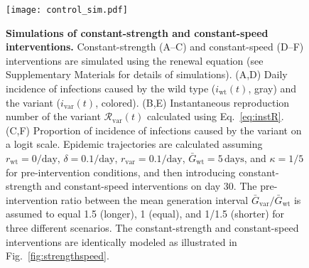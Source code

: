 \documentclass[12pt]{article}
\newcommand{\eref}[1]{Eq.~\ref{eq:#1}}
\newcommand{\fref}[1]{Fig.~\ref{fig:#1}}
\newcommand{\vvvar}{\mathrm{var}}
\newcommand{\wwwt}{\mathrm{wt}}
\newcommand{\rx}[1]{\ensuremath{{r}_{#1}}\xspace}
\newcommand{\rw}{\rx{\wwwt}}
\newcommand{\rv}{\rx{\vvvar}}
\newcommand{\Rx}[1]{\ensuremath{{\mathcal R}_{#1}}\xspace}
\newcommand{\Rv}{\Rx{\vvvar}}
\newcommand{\pday}{\ensuremath{/\textrm{day}}}
\newcommand{\ix}[1]{\ensuremath{{i}_{#1}}\xspace}
\newcommand{\iw}{\ix{\wwwt}}
\newcommand{\iv}{\ix{\vvvar}}
\newcommand{\Gx}[1]{\ensuremath{{\bar G}_{#1}}\xspace}
\newcommand{\Gy}[1]{\Gx{\mathrm{#1}}}
\begin{document}
\begin{figure}[!th]
\begin{center}
\texttt{[image: control\_sim.pdf]}
\caption{
\textbf{Simulations of constant-strength and constant-speed interventions.}
Constant-strength (A--C) and constant-speed (D--F) interventions are simulated using the renewal equation (see Supplementary Materials for details of simulations).
(A,D) Daily incidence of infections caused by the wild type ($\iw(t)$, gray) and the variant ($\iv(t)$, colored).
(B,E) Instantaneous reproduction number of the variant $\Rv(t)$ calculated using \eref{instR}.
(C,F) Proportion of incidence of infections caused by the variant on a logit scale. 
Epidemic trajectories are calculated assuming $\rw=0\pday$, $\delta=0.1\pday$, $\rv=0.1\pday$, $\Gy{wt}=5\,\textrm{days}$, and $\kappa=1/5$ for pre-intervention conditions, and then introducing constant-strength and constant-speed interventions on day 30.
The pre-intervention ratio between the mean generation interval $\Gy{var}/\Gy{wt}$ is assumed to equal 1.5 (longer), 1 (equal), and 1/1.5 (shorter) for three different scenarios.
The constant-strength and constant-speed interventions are identically modeled as illustrated in \fref{strengthspeed}.
}
\label{fig:control_sim}
\end{center}
\end{figure}
\end{document}
